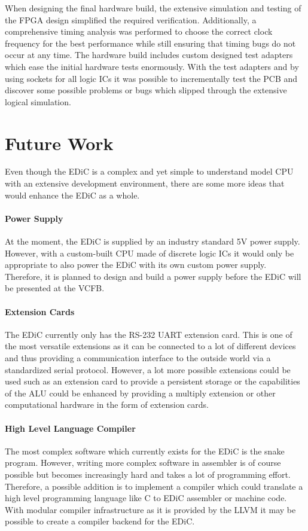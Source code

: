 When designing the final hardware build, the extensive simulation and testing of the \gls{FPGA} design simplified the required verification.
Additionally, a comprehensive timing analysis was performed to choose the correct clock frequency for the best performance while still ensuring that timing bugs do not occur at any time.
The hardware build includes custom designed test adapters which ease the initial hardware tests enormously.
With the test adapters and by using sockets for all logic \glspl{IC} it was possible to incrementally test the \gls{PCB} and discover some possible problems or bugs which slipped through the extensive logical simulation.

\section{Future Work}
Even though the \gls{EDiC} is a complex and yet simple to understand model \gls{CPU} with an extensive development environment, there are some more ideas that would enhance the \gls{EDiC} as a whole.

\paragraph{Power Supply} At the moment, the \gls{EDiC} is supplied by an industry standard 5V power supply.
However, with a custom-built \gls{CPU} made of discrete logic \glspl{IC} it would only be appropriate to also power the \gls{EDiC} with its own custom power supply.
Therefore, it is planned to design and build a power supply before the \gls{EDiC} will be presented at the \gls{VCFB}. \cite{vcfb}

\paragraph{Extension Cards} The \gls{EDiC} currently only has the RS-232 \gls{UART} extension card.
This is one of the most versatile extensions as it can be connected to a lot of different devices and thus providing a communication interface to the outside world via a standardized serial protocol.
However, a lot more possible extensions could be used such as an extension card to provide a persistent storage or the capabilities of the \gls{ALU} could be enhanced by providing a multiply extension or other computational hardware in the form of extension cards.

\paragraph{High Level Language Compiler} The most complex software which currently exists for the \gls{EDiC} is the snake program.
However, writing more complex software in assembler is of course possible but becomes increasingly hard and takes a lot of programming effort.
Therefore, a possible addition is to implement a compiler which could translate a high level programming language like C to \gls{EDiC} assembler or machine code.
With modular compiler infrastructure as it is provided by the LLVM it may be possible to create a compiler backend for the \gls{EDiC}.
